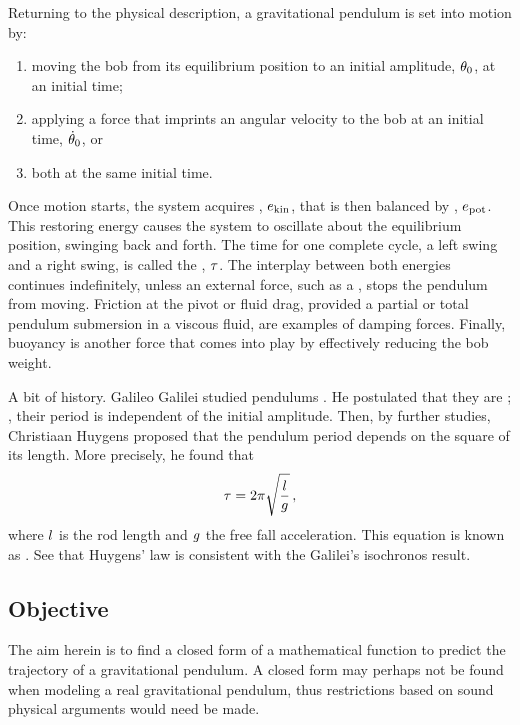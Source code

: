 Returning to the physical description, a gravitational pendulum is set into motion by:
\begin{enumerate}
\item moving the bob from its equilibrium position to an initial amplitude, $\theta_0$, at an initial time;
\item applying a force that imprints an angular velocity to the bob at an initial time, $\dot{\theta}_0$, or
\item both at the same initial time.
\end{enumerate}

Once motion starts, the system acquires , $e_\text{kin}$, that is then balanced by , $e_\text{pot}$. This restoring energy causes the system to oscillate about the equilibrium position, swinging back and forth. The time for one complete cycle, a left swing and a right swing, is called the , $\tau$. The interplay between both energies continues indefinitely, unless an external force, such as a , stops the pendulum from moving. Friction at the pivot or fluid drag, provided a partial or total pendulum submersion in a viscous fluid, are examples of damping forces. Finally, buoyancy is another force that comes into play by effectively reducing the bob weight.

A bit of history. Galileo Galilei studied pendulums . He postulated that they are ; \ie, their period is independent of the initial amplitude. Then, by further studies, Christiaan Huygens proposed that the pendulum period depends on the square of its length. More precisely, he found that
\begin{equation}\label{eq:huygenslawfortheperiod}
\tau = 2\pi\sqrt{\dfrac{l}{g}}\,,
\end{equation}
where $l$ is the rod length and $g$ the free fall acceleration. This equation is known as . See that Huygens' law is consistent with the Galilei's isochronos result.


\subsection{Objective}
The aim herein is to find a closed form of a mathematical function to predict the trajectory of a gravitational pendulum. A closed form may perhaps not be found when modeling a real gravitational pendulum, thus restrictions based on sound physical arguments would need be made.
